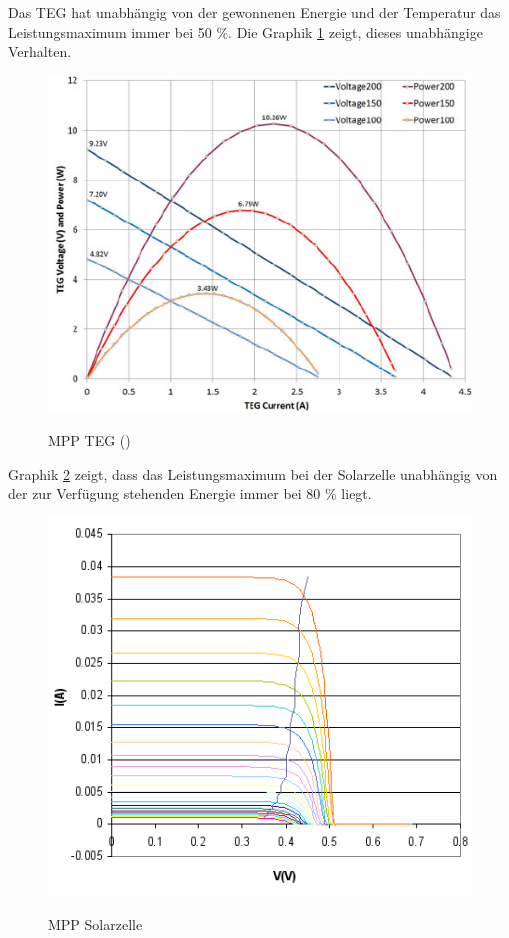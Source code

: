 Das TEG hat unabhängig von der gewonnenen Energie und der Temperatur das Leistungsmaximum immer bei 50 \%. Die Graphik \ref{MPP_TEG} zeigt, dieses unabhängige Verhalten. 

\begin{figure}
 \includegraphics{2TheoretischeGrundlagen/imag/MPPTEG.png}\label{MPP_TEG} 
\caption{MPP TEG (\cite{MPP_TEG})}
\end{figure}


Graphik \ref{mpp_solar} zeigt, dass das Leistungsmaximum bei der Solarzelle unabhängig von der zur Verfügung stehenden Energie immer bei 80 \% liegt.

\begin{figure}
   \includegraphics{2TheoretischeGrundlagen/imag/MPPSolar.png}\label{mpp_solar} 
   \caption{MPP Solarzelle }
\end{figure}

